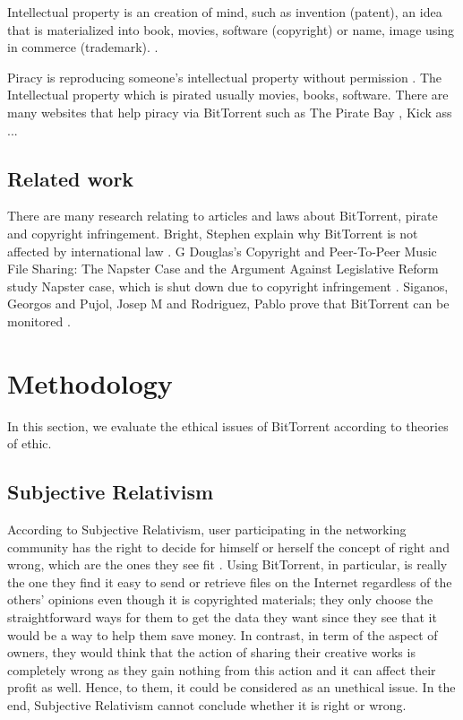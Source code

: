 \documentclass[conference]{IEEEtran}
\begin{document}
Intellectual property is an creation of mind, such as invention (patent), an idea that is materialized into book, movies, software (copyright) or name, image using in commerce (trademark).  \cite{intellproperty}. 

Piracy is reproducing someone's intellectual property without permission \cite{piracydef}. The Intellectual property which is pirated usually movies, books, software. There are many websites that help piracy via BitTorrent such as The Pirate Bay \cite{piratebay}, Kick ass \cite{kickass} ...


\subsection{Related work}
There are many research relating to articles and laws about BitTorrent, pirate and copyright infringement. Bright, Stephen explain why BitTorrent is not affected by international law \cite{bright2011current}. G Douglas's Copyright and Peer-To-Peer Music File Sharing: The Napster Case and the Argument Against Legislative Reform study Napster case, which is shut down due to copyright infringement \cite{douglas2004copyright}. Siganos, Georgos and Pujol, Josep M and Rodriguez, Pablo prove that BitTorrent can be monitored \cite{siganos2009monitoring}.

\section{Methodology} \label{method}
In this section, we evaluate the ethical issues of BitTorrent according to theories of ethic.

\subsection{Subjective Relativism}
According to Subjective Relativism, user participating in the networking community has the right to decide for himself or herself the concept of right and wrong, which are the ones they see fit \cite{quinn2014ethics} . Using BitTorrent, in particular, is really the one they find it easy to send or retrieve files on the Internet regardless of the others' opinions even though it is copyrighted materials; they only choose the straightforward ways for them to get the data they want since they see that it would be a way to help them save money. In contrast, in term of the aspect of owners, they would think that the action of sharing their creative works is completely wrong as they gain nothing from this action and it can affect their profit as well. Hence, to them, it could be considered as an unethical issue. In the end, Subjective Relativism cannot conclude whether it is right or wrong.  
\end{document}
